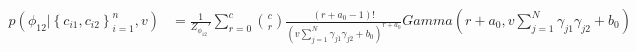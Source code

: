 \documentclass[fleqn,11pt]{wlscirep}
\begin{document}
\begin{align}
p(\phi_{12} |  \left\{c_{i1}, c_{i2}\right\}_{i=1}^n, v) &=  \frac{1}{Z_{\phi_{12}}'} \sum_{r=0}^c  \binom{c}{r} \frac{(r + a_0 - 1)!}{ \left(v \sum_{j=1}^N \gamma_{j1} \gamma_{j2} + b_0 \right)^{r + a_0}} Gamma \left(r+ a_0, v \sum_{j=1}^N \gamma_{j1} \gamma_{j2} + b_0 \right)
\end{align}
\end{document}
